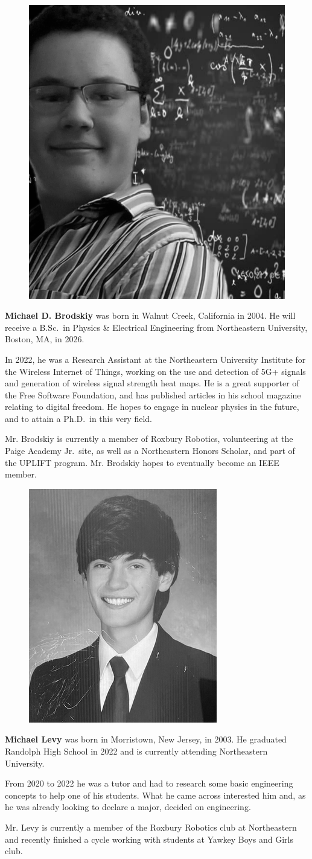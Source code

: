 \documentclass[conference]{IEEEtran}
\begin{document}
  \begin{figure}
    \includegraphics[width=.175\textwidth]{Figures/headshot.png}
  \end{figure}
  \par\textbf{Michael D. Brodskiy} was born in Walnut Creek, California in 2004. He will receive a B.Sc.\ in Physics \& Electrical Engineering from Northeastern University, Boston, MA, in 2026.  
\par In 2022, he was a Research Assistant at the Northeastern University Institute for the Wireless Internet of Things, working on the use and detection of 5G+ signals and generation of wireless signal strength heat maps. He is a great supporter of the Free Software Foundation, and has published articles in his school magazine relating to digital freedom. He hopes to engage in nuclear physics in the future, and to attain a Ph.D.\ in this very field.
\par Mr. Brodskiy is currently a member of Roxbury Robotics, volunteering at the Paige Academy Jr.\ site, as well as a Northeastern Honors Scholar, and part of the UPLIFT program. Mr. Brodskiy hopes to eventually become an IEEE member.  

  \begin{figure}
    \includegraphics[width=.175\textwidth]{Figures/LevyImage.png}
  \end{figure}
  \par \textbf{Michael Levy} was born in Morristown, New Jersey, in 2003. He graduated Randolph High School in 2022 and is currently attending Northeastern University. 
\par    From 2020 to 2022 he was a tutor and had to research some basic engineering concepts to help one of his students. What he came across interested him and, as he was already looking to declare a major, decided on engineering. 
   \par Mr. Levy is currently a member of the Roxbury Robotics club at Northeastern and recently finished a cycle working with students at Yawkey Boys and Girls club. 
\end{document}
